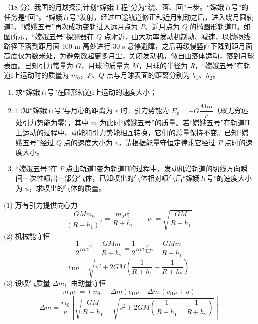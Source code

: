 \begin{problem}
（18 分）我国的月球探测计划“嫦娥工程”分为“绕、落、回”三步。“嫦娥五号”的任务是“回”。“嫦娥五号”发射，经过中途轨道修正和近月制动之后，进入绕月圆轨道$\mathrm{I}$。“嫦娥五号”再次成功变轨进入远月点为 $P$、近月点为 $Q$ 的椭圆形轨道$\mathrm{II}$。如图所示，“嫦娥五号”探测器在 $Q$ 点附近，由大功率发动机制动、减速，以抛物线路径下落到距月面 100 m 高处进行 30 s 悬停避障，之后再缓慢竖直下降到距月面高度仅为数米处，为避免激起更多月尘，关闭发动机，做自由落体运动，落到月球表面。已知引力常量为 $G$，月球的质量为 $M$，月球的半径为 $R$，“嫦娥五号”在轨道$\mathrm{I}$上运动时的质量为 $m_0$，$P$、$Q$ 点与月球表面的距离分别为 $h_1$、$h_2$。
\begin{enumerate}[label=(\arabic*),leftmargin=2.5em,itemsep=0pt]
\item 求“嫦娥五号”在圆形轨道$\mathrm{I}$上运动的速度大小；
\item 已知“嫦娥五号”与月心的距离为 $r$ 时，引力势能为 $E_p=-G\dfrac{Mm}{r}$（取无穷远处引力势能为零），其中 $m$ 为此时“嫦娥五号”的质量。若“嫦娥五号”在轨道$\mathrm{II}$上运动的过程中，动能和引力势能相互转换，它们的总量保持不变。已知“嫦娥五号”经过 $Q$ 点的速度大小为 $v$，请根据能量守恒定律求它经过 $P$ 点时的速度大小。
\item “嫦娥五号”在 $P$ 点由轨道$\mathrm{I}$变为轨道$\mathrm{II}$的过程中，发动机沿轨道的切线方向瞬间一次性喷出一部分气体，已知喷出的气体相对喷气后“嫦娥五号”的速度大小为 $u$，求喷出的气体的质量。
\end{enumerate}
\begin{solution}
(1) 万有引力提供向心力
\[
\frac{GMm_0}{(R+h_1)^2}=\frac{m_0v_1^2}{R+h_1}\qquad v_1=\sqrt{\frac{GM}{R+h_1}}
\]
(2) 机械能守恒
\[
\frac{1}{2}mv^2-\frac{GMm}{R+h_2}=\frac{1}{2}mv_{\mathrm{II}P}^2-\frac{GMm}{R+h_1}
\]
\[
v_{\mathrm{II}P}=\sqrt{v^2+2GM\left(\frac{1}{R+h_1}-\frac{1}{R+h_2}\right)}
\]
(3) 设喷气质量 $\Delta m$，由动量守恒
\[
m_0v_1=(m_0-\Delta m)v_{\mathrm{II}P}+\Delta m\,(v_{\mathrm{II}P}+u)
\]
\[
\Delta m=\frac{m_0}{u}\left[\sqrt{\frac{GM}{R+h_1}}-\sqrt{v^2+2GM\left(\frac{1}{R+h_1}-\frac{1}{R+h_2}\right)}\right]
\]
\end{solution}
\end{problem}

